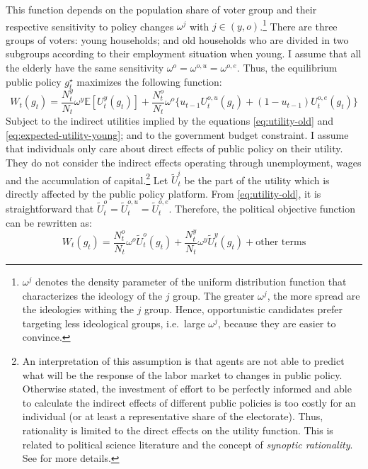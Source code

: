 \documentclass[
]{article}
\begin{document}
This function depends on the population share of voter group and their respective sensitivity to policy changes \(\omega^j\) with \(j \in \left(y,o\right)\).\footnote{\(\omega^j\) denotes the density parameter of the uniform distribution function that characterizes the ideology of the \(j\) group. The greater \(\omega^j\), the more spread are the ideologies withing the \(j\) group. Hence, opportunistic candidates prefer targeting less ideological groups, i.e.~large \(\omega^j\), because they are easier to convince.} There are three groups of voters: young households; and old households who are divided in two subgroups according to their employment situation when young. I assume that all the elderly have the same sensitivity \(\omega^o = \omega^{o,u} = \omega^{o,e}\). Thus, the equilibrium public policy \(g_t^\star\) maximizes the following function:
\begin{equation*}
    W_t(g_t) = \frac{N_t^y}{N_t} \omega^y \mathbb{E}\left[U_t^y(g_t)\right] + \frac{N_t^o}{N_t} \omega^o \Big\{ u_{t-1} U_t^{o,u}(g_t) + (1-u_{t-1}) U_t^{o,e}(g_t) \Big\}
\end{equation*}
Subject to the indirect utilities implied by the equations \eqref{eq:utility-old} and \eqref{eq:expected-utility-young}; and to the government budget constraint.
I assume that individuals only care about direct effects of public policy on their utility. They do not consider the indirect effects operating through unemployment, wages and the accumulation of capital.\footnote{An interpretation of this assumption is that agents are not able to predict what will be the response of the labor market to changes in public policy. Otherwise stated, the investment of effort to be perfectly informed and able to calculate the indirect effects of different public policies is too costly for an individual (or at least a representative share of the electorate). Thus, rationality is limited to the direct effects on the utility function. This is related to political science literature and the concept of \emph{synoptic rationality}. See \citet{Meier1980} for more details.} Let \(\tilde{U}^i_t\) be the part of the utility which is directly affected by the public policy platform. From \eqref{eq:utility-old}, it is straightforward that \(\tilde{U}_t^o = \tilde{U}_t^{o,u} = \tilde{U}_t^{o,e}\). Therefore, the political objective function can be rewritten as:
\begin{equation*}
    W_t(g_t) = \frac{N_t^o}{N_t} \omega^o \tilde{U}_t^o(g_t) + \frac{N_t^y}{N_t} \omega^y \tilde{U}_t^y(g_t) + \text{other terms}
\end{equation*}
\end{document}
